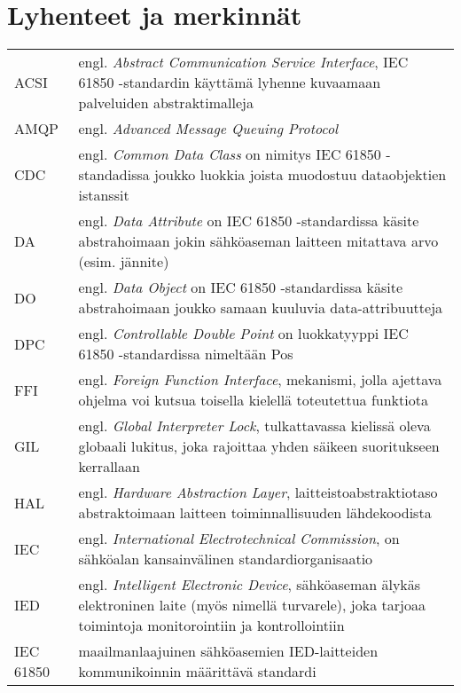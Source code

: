 \chapter*{Lyhenteet ja merkinnät}
\label{ch:lyhenteetjamerkinnat}

\begin{tabular}[h]{@{} p{} p{} @{}}
	ACSI & engl. \emph{Abstract Communication Service Interface}, IEC 61850 -standardin käyttämä lyhenne kuvaamaan palveluiden abstraktimalleja \\
	AMQP & engl. \emph{Advanced Message Queuing Protocol} \\
	CDC & engl. \emph{Common Data Class} on nimitys IEC 61850 -standadissa joukko luokkia joista muodostuu dataobjektien istanssit \\
	DA & engl. \emph{Data Attribute} on IEC 61850 -standardissa käsite abstrahoimaan jokin sähköaseman laitteen mitattava arvo (esim. jännite) \\
	DO & engl. \emph{Data Object} on IEC 61850 -standardissa käsite abstrahoimaan joukko samaan kuuluvia data-attribuutteja \\
	DPC & engl. \emph{Controllable Double Point} on luokkatyyppi IEC 61850 -standardissa nimeltään Pos \\
	FFI & engl. \emph{Foreign Function Interface}, mekanismi, jolla ajettava ohjelma voi kutsua toisella kielellä toteutettua funktiota\\
	GIL & engl. \emph{Global Interpreter Lock}, tulkattavassa kielissä oleva globaali lukitus, joka rajoittaa yhden säikeen suoritukseen kerrallaan \\
	HAL & engl. \emph{Hardware Abstraction Layer}, laitteistoabstraktiotaso abstraktoimaan laitteen toiminnallisuuden lähdekoodista \\
	IEC & engl. \emph{International Electrotechnical Commission}, on sähköalan kansainvälinen standardiorganisaatio \\
	IED & engl. \emph{Intelligent Electronic Device}, sähköaseman älykäs elektroninen laite (myös nimellä turvarele), joka tarjoaa toimintoja monitorointiin ja kontrollointiin \\
	IEC 61850 & maailmanlaajuinen sähköasemien IED-laitteiden kommunikoinnin määrittävä standardi \\

\end{tabular}

